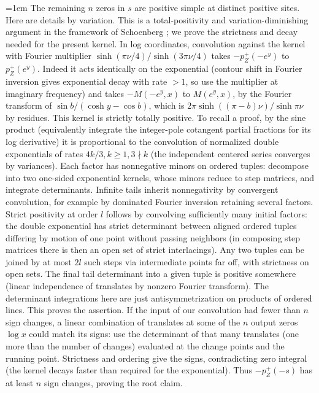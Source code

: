 \documentclass[11pt]{article}
\numberwithin{equation}{section}
\theoremstyle{definition}\newtheorem{definition}[theorem]{Definition}
\theoremstyle{remark}\newtheorem{remark}[theorem]{Remark}
\begin{document}
\begingroup\emergencystretch=1em
The remaining \(n\) zeros in \(s\) are positive simple at distinct positive sites. Here are details by variation. This is a total-positivity and variation-diminishing argument in the framework of Schoenberg \cite[Theorem~1 and p.~17]{Schoenberg1947}; we prove the strictness and decay needed for the present kernel. In log coordinates, convolution against the kernel with Fourier multiplier \(\sinh(\pi\nu/4)/\sinh(3\pi\nu/4)\) takes \(-p_Z^+(-e^y)\) to \(p_Z^+(e^y)\). Indeed it acts identically on the exponential (contour shift in Fourier inversion gives exponential decay with rate \(>1\), so use the multiplier at imaginary frequency) and takes \(-M(-e^y,x)\) to \(M(e^y,x)\), by the Fourier transform of \(\sin b/(\cosh y-\cos b)\), which is \(2\pi\sinh((\pi-b)\nu)/\sinh\pi\nu\) by residues. This kernel is strictly totally positive. To recall a proof, by the sine product (equivalently integrate the integer-pole cotangent partial fractions for its log derivative) it is proportional to the convolution of normalized double exponentials of rates \(4k/3, k\ge1, 3\nmid k\) (the independent centered series converges by variances). Each factor has nonnegative minors on ordered tuples: decompose into two one-sided exponential kernels, whose minors reduce to step matrices, and integrate determinants. Infinite tails inherit nonnegativity by convergent convolution, for example by dominated Fourier inversion retaining several factors. Strict positivity at order \(l\) follows by convolving sufficiently many initial factors: the double exponential has strict determinant between aligned ordered tuples differing by motion of one point without passing neighbors (in composing step matrices there is then an open set of strict interlacings). Any two tuples can be joined by at most \(2l\) such steps via intermediate points far off, with strictness on open sets. The final tail determinant into a given tuple is positive somewhere (linear independence of translates by nonzero Fourier transform). The determinant integrations here are just antisymmetrization on products of ordered lines. This proves the assertion. If the input of our convolution had fewer than \(n\) sign changes, a linear combination of translates at some of the \(n\) output zeros \(\log x\) could match its signs: use the determinant of that many translates (one more than the number of changes) evaluated at the change points and the running point. Strictness and ordering give the signs, contradicting zero integral (the kernel decays faster than required for the exponential). Thus \(-p_Z^+(-s)\) has at least \(n\) sign changes, proving the root claim.
\par\endgroup
\end{document}
